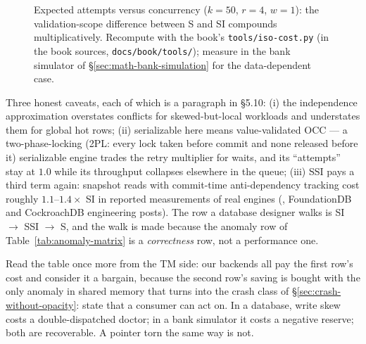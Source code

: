 \begin{figure}[htbp]
\centering
{}
\caption{Expected attempts versus concurrency ($k=50$, $r=4$, $w=1$): the
validation-scope difference between S and SI compounds multiplicatively.
Recompute with the book's \texttt{tools/iso-cost.py} (in the book sources,
\texttt{docs/book/tools/}); measure in the bank simulator of
\S\ref{sec:math-bank-simulation} for the data-dependent case.}
\label{fig:iso-cost}
\end{figure}

Three honest caveats, each of which is a paragraph in \S5.10: (i) the
independence approximation overstates conflicts for skewed-but-local
workloads and understates them for global hot rows; (ii) serializable here
means value-validated OCC --- a two-phase-locking
(2PL: every lock taken before commit and none released before it) serializable engine trades
the retry multiplier for waits, and its ``attempts'' stay at $1.0$ while its
throughput collapses elsewhere in the queue; (iii) SSI pays a third term
again: snapshot reads with commit-time anti-dependency tracking cost
roughly $1.1$--$1.4\times$ SI in reported measurements of real engines
(\cite{kleppmann17}, FoundationDB and CockroachDB engineering posts). The
row a database designer walks is SI $\to$ SSI $\to$ S, and the walk is made
because the anomaly row of Table~\ref{tab:anomaly-matrix} is a
\emph{correctness} row, not a performance one.

Read the table once more from the TM side: our backends all pay the first
row's cost and consider it a bargain, because the second row's saving is
bought with the only anomaly in shared memory that turns into the crash class
of \S\ref{sec:crash-without-opacity}: state that a consumer can act on. In a
database, write skew costs a double-dispatched doctor; in a bank simulator it
costs a negative reserve; both are recoverable. A pointer torn the same way
is not.

